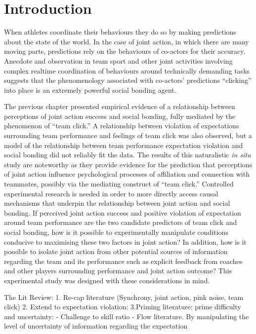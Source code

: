 %


\section{Introduction}
When athletes coordinate their behaviours they do so by making predictions about the state of the world.  In the case of joint action, in which there are many moving parts, predictions rely on the behaviours of co-actors for their accuracy. Anecdote and observation in team sport and other joint activities involving complex realtime coordination of behaviours around technically demanding tasks suggests that the phenomenology associated with co-actors' predictions ``clicking'' into place is an extremely powerful social bonding agent.

The previous chapter presented empirical evidence of a relationship between perceptions of joint action success and social bonding, fully mediated by the phenomenon of ``team click.'' A relationship between violation of expectations surrounding team performance and feelings of team click was also observed, but a model of the relationship between team performance expectation violation and social bonding did not reliably fit the data.  The results of this naturalistic \textit{in situ} study are noteworthy as they provide evidence for the prediction that perceptions of joint action influence psychological processes of affiliation and connection with teammates, possibly via the mediating construct of ``team click.''  Controlled experimental research is needed in order to more directly access causal mechanisms that underpin the relationship between joint action and social bonding.  If perceived joint action success and positive violation of expectation around team performance are the two candidate predictors of team click and social bonding, how is it possible to experimentally manipulate conditions conducive to maximising these two factors in joint action? In addition, how is it possible to isolate joint action from other potential sources of information regarding the team and its performance such as explicit feedback from coaches and other players surrounding performance and joint action outcome? This experimental study was designed with these considerations in mind.

The Lit Review:
1. Re-cap literature (Synchrony, joint action, pink noise, team click)
2. Extend to expectation violation:
3.Priming literature: prime difficulty and uncertainty:
- Challenge to skill ratio - Flow literature.
By manipulating the level of uncertainty of information regarding the expectation


